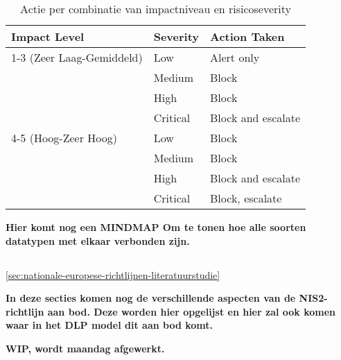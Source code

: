 \begin{table}[h]
    \centering
    \small
    \scriptsize
    \begin{tabular}{l l l}
        \toprule
        \textbf{Impact Level} & \textbf{Severity} & \textbf{Action Taken} \\
        \midrule
        1-3 (Zeer Laag-Gemiddeld) & Low      & Alert only \\
                                  & Medium   & Block \\
                                  & High     & Block \\
                                  & Critical & Block and escalate \\
        4-5 (Hoog-Zeer Hoog)      & Low      & Block \\
                                  & Medium   & Block \\
                                  & High     & Block and escalate \\
                                  & Critical & Block, escalate \\
        \bottomrule
    \end{tabular}
    \caption{Actie per combinatie van impactniveau en risicoseverity}
    \label{tab:risico_acties}
\end{table}



\textbf{Hier komt nog een MINDMAP Om te tonen hoe alle soorten datatypen met elkaar verbonden zijn.}

\subsection {}
\label{sec:nis2_richtlijn}

\ref{sec:nationale-europese-richtlijnen-literatuurstudie}

\textbf{In deze secties komen nog de verschillende aspecten van de NIS2-richtlijn aan bod. Deze worden hier opgelijst en hier zal ook komen waar in het DLP model dit aan bod komt.}

\textbf{WIP, wordt maandag afgewerkt.}



